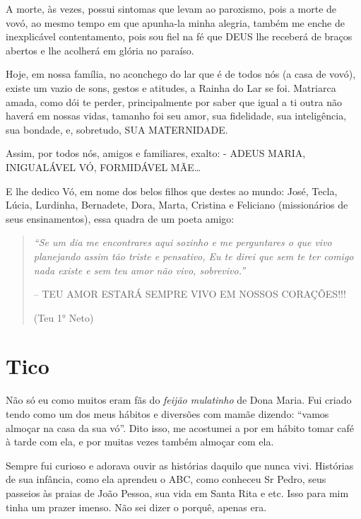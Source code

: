\documentclass[
  brazil,
  a6paper,
  oneside,
  landscape,
  14pt]{scrbook}
\begin{document}
A morte, às vezes, possui sintomas que levam ao paroxismo, pois a morte
de vovó, ao mesmo tempo em que apunha-la minha alegria, também me enche
de inexplicável contentamento, pois sou fiel na fé que DEUS lhe receberá
de braços abertos e lhe acolherá em glória no paraíso.

Hoje, em nossa família, no aconchego do lar que é de todos nós (a casa
de vovó), existe um vazio de sons, gestos e atitudes, a Rainha do Lar se
foi. Matriarca amada, como dói te perder, principalmente por saber que
igual a ti outra não haverá em nossas vidas, tamanho foi seu amor, sua
fidelidade, sua inteligência, sua bondade, e, sobretudo, SUA
MATERNIDADE.

Assim, por todos nós, amigos e familiares, exalto: - ADEUS MARIA,
INIGUALÁVEL VÓ, FORMIDÁVEL MÃE\ldots{}

E lhe dedico Vó, em nome dos belos filhos que destes ao mundo: José,
Tecla, Lúcia, Lurdinha, Bernadete, Dora, Marta, Cristina e Feliciano
(missionários de seus ensinamentos), essa quadra de um poeta amigo:

\begin{quote}
\emph{``Se um dia me encontrares aqui sozinho e me perguntares o que
vivo planejando assim tão triste e pensativo, Eu te direi que sem te ter
comigo nada existe e sem teu amor não vivo, sobrevivo.''}

-- TEU AMOR ESTARÁ SEMPRE VIVO EM NOSSOS CORAÇÕES!!!

(Teu 1° Neto)
\end{quote}

\hypertarget{tico}{%
\section{Tico}\label{tico}}

Não só eu como muitos eram fãs do \emph{feijão mulatinho} de Dona Maria.
Fui criado tendo como um dos meus hábitos e diversões com mamãe dizendo:
``vamos almoçar na casa da sua vó''. Dito isso, me acostumei a por em
hábito tomar café à tarde com ela, e por muitas vezes também almoçar com
ela.

Sempre fui curioso e adorava ouvir as histórias daquilo que nunca vivi.
Histórias de sua infância, como ela aprendeu o ABC, como conheceu Sr
Pedro, seus passeios às praias de João Pessoa, sua vida em Santa Rita e
etc. Isso para mim tinha um prazer imenso. Não sei dizer o porquê,
apenas era.
\end{document}
